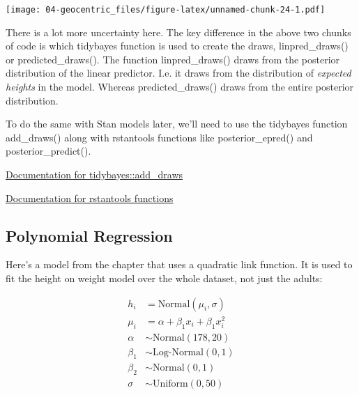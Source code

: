 \documentclass[
]{book}
\begin{document}
\texttt{[image: 04-geocentric\_files/figure-latex/unnamed-chunk-24-1.pdf]}

There is a lot more uncertainty here. The key difference in the above two chunks of code is which tidybayes function is used to create the draws, linpred\_draws() or predicted\_draws(). The function linpred\_draws() draws from the posterior distribution of the linear predictor. I.e. it draws from the distribution of \emph{expected heights} in the model. Whereas predicted\_draws() draws from the entire posterior distribution.

To do the same with Stan models later, we'll need to use the tidybayes function add\_draws() along with rstantools functions like posterior\_epred() and posterior\_predict().

\href{https://mjskay.github.io/tidybayes/reference/add_draws.html}{Documentation for tidybayes::add\_draws}

\href{https://mc-stan.org/rstantools/reference/index.html}{Documentation for rstantools functions}

\hypertarget{polynomial-regression}{%
\subsection{Polynomial Regression}\label{polynomial-regression}}

Here's a model from the chapter that uses a quadratic link function. It is used to fit the height on weight model over the whole dataset, not just the adults:

\[
\begin{aligned}
h_i &= \text{Normal}(\mu_i, \sigma)\\
\mu_i &= \alpha + \beta_1x_i + \beta_1x_i^2\\
\alpha &\sim \text{Normal}(178, 20) \\
\beta_1 &\sim \text{Log-Normal}(0, 1) \\
\beta_2 &\sim \text{Normal}(0, 1) \\
\sigma &\sim \text{Uniform}(0,50)
\end{aligned}
\]
\end{document}
